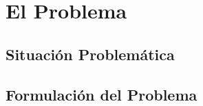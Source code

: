 \section{El Problema}
\label{sec:problema}

\subsection{Situación Problemática}


\subsection{Formulación del Problema}


\endinput
